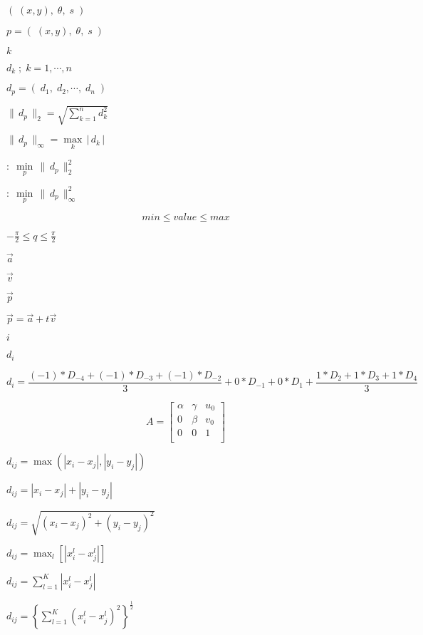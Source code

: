 \documentclass{article}
\begin{document}
$(\; (x,y), \; \theta, \; s \;)$
\pagebreak

$ p = (\; (x,y), \; \theta, \; s \;) $
\pagebreak

$ k $
\pagebreak

$ d_k \; ; \; k=1, \cdots, n $
\pagebreak

$ d_p = (\; d_1, \; d_2, \cdots, \; d_n \;) $
\pagebreak

$ \|\, d_p \,\|_2 = \sqrt{\sum_{k=1}^{n} d_k^2} $
\pagebreak

$ \|\, d_p \,\|_\infty = \underset{k}{\max}\,|\, d_k \,| $
\pagebreak

$ :\; \underset{p}{\min}\,\|\, d_p \,\|_2^2 $
\pagebreak

$ :\; \underset{p}{\min}\,\|\, d_p \,\|_\infty^2 $
\pagebreak

\[ min \le value \le max \]
\pagebreak

$ -\frac{\pi}{2} \le q \le \frac{\pi}{2} $
\pagebreak

$ \vec{a} $
\pagebreak

$ \vec{v} $
\pagebreak

$ \vec{p} $
\pagebreak

$ \vec{p} = \vec{a} + t\vec{v} $
\pagebreak

$i$
\pagebreak

$d_{i}$
\pagebreak

\[ d_i = \frac{ (-1)*D_{-4} + (-1)*D_{-3} + (-1)*D_{-2} }{3} + 0*D_{-1} + 0*D_1 + \frac{1*D_2 + 1*D_3 + 1*D_4}{3} \]
\pagebreak

\[ A = \left[ \begin{array}{ccc} \alpha & \gamma & u_0 \\ 0 & \beta & v_0 \\ 0 & 0 & 1 \\ \end{array} \right] \]
\pagebreak

$ d_{ij} = \max \left(| x_{i} - x_{j} | , | y_{i} - y_{j} | \right) $
\pagebreak

$ d_{ij} = | x_{i} - x_{j} | + | y_{i} - y_{j} | $
\pagebreak

$ d_{ij} = \sqrt{\left( x_{i} - x_{j} \right)^2+\left( y_{i} - y_{j} \right)^2} $
\pagebreak

$ d_{ij} = \max _{l} \left[ | x_{i}^{l} - x_{j}^{l} | \right] $
\pagebreak

$ d_{ij} = \sum _{l = 1}^{K} | x_{i}^{l} - x_{j}^{l} | $
\pagebreak

$ d_{ij} = \left\{ \sum _{l = 1}^{K} \left( x_{i}^{l} - x_{j}^{l} \right)^{2} \right\}^\frac{1}{2} $
\pagebreak
\end{document}
